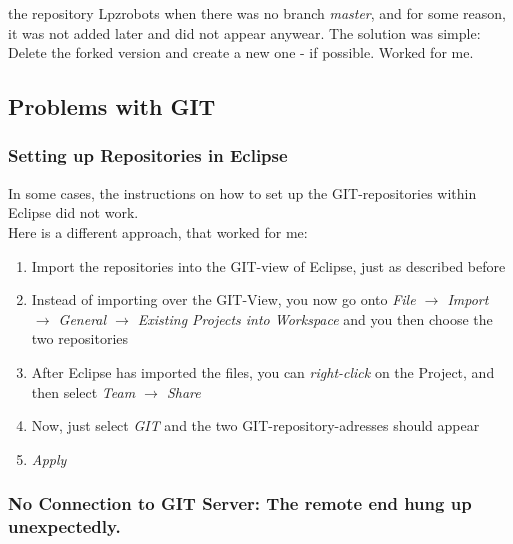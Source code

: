 the repository Lpzrobots when there was no branch \emph{master}, and for some reason, it was not added later and did not appear anywear.
The solution was simple: Delete the forked version and create a new one - if possible. Worked for me.



\subsection{Problems with GIT}

\subsubsection{Setting up Repositories in Eclipse}
\label{EclipseGIT}
In some cases, the instructions on how to set up the GIT-repositories within Eclipse did not work. \\
Here is a different approach, that worked for me: \\
\begin{enumerate}
 \item Import the repositories into the GIT-view of Eclipse, just as described before
 \item Instead of importing over the GIT-View, you now go onto \emph{File $\rightarrow$ Import $\rightarrow$ General $\rightarrow$ Existing Projects into Workspace} and you then choose the two repositories
 \item After Eclipse has imported the files, you can \emph{right-click} on the Project, and then select \emph{Team $\rightarrow$ Share}
 \item Now, just select \emph{GIT} and the two GIT-repository-adresses should appear
 \item \emph{Apply}
\end{enumerate}


\subsubsection{No Connection to GIT Server: The remote end hung up unexpectedly.}

